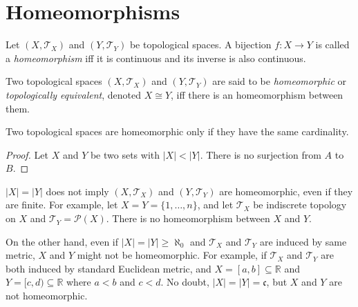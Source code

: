 \section{Homeomorphisms}


\begin{definition}
	[homeomorphisms]
	\label{def: homomorphisms}
	Let $(X, \mathcal T_X)$ and $(Y, \mathcal T_Y)$ be topological spaces. A bijection $f: X \to Y$ is called a \textit{homeomorphism} iff it is continuous and its inverse is also continuous.
\end{definition}


\begin{definition}
	[homeomorphic]
	\label{def: homomorphic}
	Two topological spaces $(X, \mathcal T_X)$ and $(Y, \mathcal T_Y)$ are said to be \textit{homeomorphic} or \textit{topologically equivalent}, denoted $X \cong Y$, iff there is an homeomorphism between them.
\end{definition}


\begin{proposition}
	Two topological spaces are homeomorphic only if they have the same cardinality.
	
	\begin{proof}
		Let $X$ and $Y$ be two sets with $|X| < |Y|$. There is no surjection from $A$ to $B$.
	\end{proof}
\end{proposition}


\begin{example}
	$|X| = |Y|$ does not imply $(X, \mathcal T_X)$ and $(Y, \mathcal T_Y)$ are homeomorphic, even if they are finite. For example, let $X = Y = \{1, \ldots, n\}$, and let $\mathcal T_X$ be indiscrete topology on $X$ and $\mathcal T_Y = \mathcal P(X)$. There is no homeomorphism between $X$ and $Y$.
	
	On the other hand, even if $|X| = |Y| \ge \aleph_0$ and $\mathcal T_X$ and $\mathcal T_Y$ are induced by same metric, $X$ and $Y$ might not be homeomorphic. For example, if $\mathcal T_X$ and $\mathcal T_Y$ are both induced by standard Euclidean metric, and $X = [a, b] \subseteq \mathbb R$ and $Y = [c, d) \subseteq \mathbb R$ where $a < b$ and $c < d$. No doubt, $|X| = |Y| = \mathfrak c$, but $X$ and $Y$ are not homeomorphic.
\end{example}


